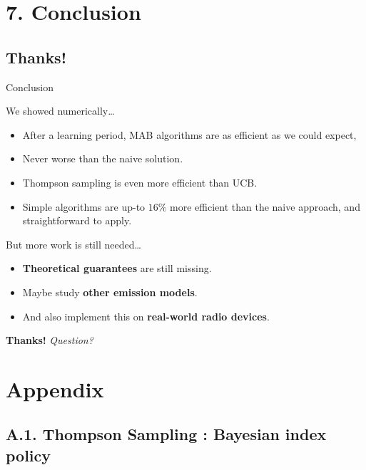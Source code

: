 \documentclass[12pt,english,ignorenonframetext,aspectratio=169,]{beamer}
\providecommand{\tightlist}{%
  \setlength{\itemsep}{0pt}\setlength{\parskip}{0pt}}
\begin{document}
\section{\hfill{}7. Conclusion\hfill{}}\subsection{\hfill{}Thanks!\hfill{}}

\begin{frame}{Conclusion}

\begin{block}{We showed numerically\ldots{}}

\begin{itemize}
\tightlist
\item
  After a learning period, MAB algorithms are as efficient as we could expect,
\item
  Never worse than the naive solution.
\item
  Thompson sampling is even more efficient than UCB.
\item
  Simple algorithms are up-to \(16\%\) more efficient than the naive
  approach, and straightforward to apply.
\end{itemize}

\end{block}

\begin{block}{But more work is still needed\ldots{}}

\begin{itemize}
\tightlist
\item
  \textbf{Theoretical guarantees} are still missing.
\item
  Maybe study \textbf{other emission models}.
\item
  And also implement this on \textbf{real-world radio devices}.
\end{itemize}

\end{block}

\hfill{} \textbf{Thanks!} \emph{Question?}

\end{frame}

\appendix
\backupbegin

\section{\hfill{}Appendix\hfill{}}

\subsection{\hfill{}A.1. Thompson Sampling : Bayesian index policy\hfill{}}
\end{document}
